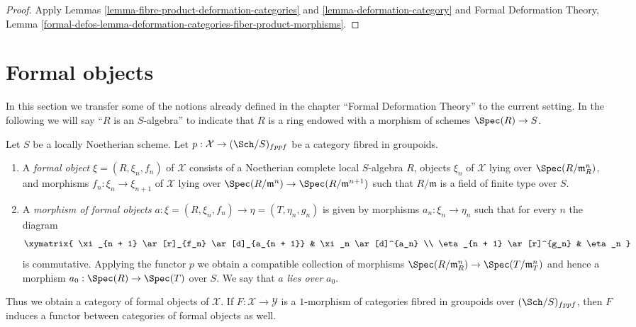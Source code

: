 \begin{proof}
Apply Lemmas \ref{lemma-fibre-product-deformation-categories} and
\ref{lemma-deformation-category}
and Formal Deformation Theory, Lemma
\ref{formal-defos-lemma-deformation-categories-fiber-product-morphisms}.
\end{proof}






\section{Formal objects}
\label{section-formal-objects}

\noindent
In this section we transfer some of the notions already defined
in the chapter ``Formal Deformation Theory'' to the current setting.
In the following we will say ``$R$ is an $S$-algebra'' to indicate
that $R$ is a ring endowed with a morphism of schemes $\Spec(R) \to S$.

\begin{definition}
\label{definition-formal-objects}
Let $S$ be a locally Noetherian scheme. Let
$p : \mathcal{X} \to (\Sch/S)_{fppf}$ be a category fibred in groupoids.
\begin{enumerate}
\item A {\it formal object} $\xi = (R, \xi_n, f_n)$ of $\mathcal{X}$ consists
of a Noetherian complete local $S$-algebra $R$, objects $\xi_n$ of
$\mathcal{X}$ lying over $\Spec(R/\mathfrak m_R^n)$, and morphisms
$f_n : \xi_n \to \xi_{n + 1}$ of $\mathcal{X}$ lying over
$\Spec(R/\mathfrak m^n) \to \Spec(R/\mathfrak m^{n + 1})$
such that $R/\mathfrak m$ is a field of finite type over $S$.
\item A {\it morphism of formal objects}
$a : \xi = (R, \xi_n, f_n) \to \eta = (T, \eta_n, g_n)$
is given by morphisms $a_n : \xi_n \to \eta_n$ such that for every $n$
the diagram
$$
\xymatrix{
\xi_{n + 1} \ar[r]_{f_n} \ar[d]_{a_{n + 1}} & \xi_n \ar[d]^{a_n} \\
\eta_{n + 1} \ar[r]^{g_n} & \eta_n
}
$$
is commutative. Applying the functor $p$ we obtain a compatible collection
of morphisms $\Spec(R/\mathfrak m_R^n) \to \Spec(T/\mathfrak m_T^n)$ and
hence a morphism $a_0 : \Spec(R) \to \Spec(T)$ over $S$. We say that
$a$ {\it lies over} $a_0$.
\end{enumerate}
\end{definition}

\noindent
Thus we obtain a category of formal objects of $\mathcal{X}$. If
$F : \mathcal{X} \to \mathcal{Y}$ is a $1$-morphism of categories fibred
in groupoids over $(\Sch/S)_{fppf}$, then $F$ induces a functor between
categories of formal objects as well.

